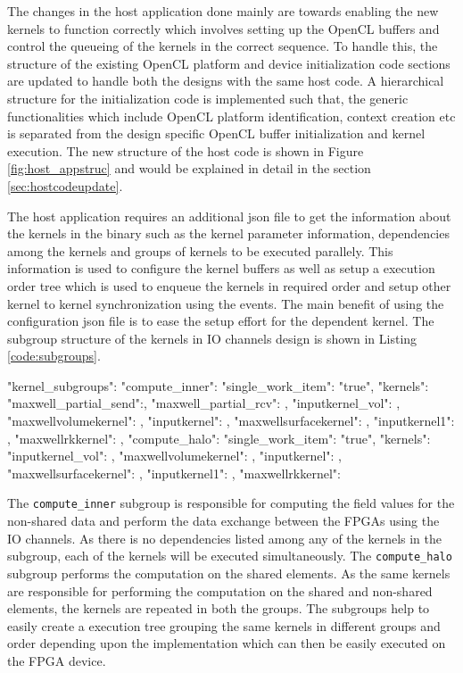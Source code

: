 The changes in the host application done mainly are towards enabling the new kernels to function correctly
which involves setting up the OpenCL buffers and control the queueing of the kernels in the correct sequence.
To handle this, the structure of the existing OpenCL platform and device initialization code sections are
updated to handle both the designs with the same host code. A hierarchical structure for the initialization code
is implemented such that, the generic functionalities which include OpenCL platform identification,
context creation etc is separated from the design specific OpenCL buffer
initialization and kernel execution. The new structure of the host code is shown
in Figure \ref{fig:host_appstruc} and would be explained in detail in the section \ref{sec:hostcodeupdate}.

The host application requires an additional json file to get the information about the kernels in the binary such as
the kernel parameter information, dependencies among the kernels and groups of kernels to be executed parallely.
This information is used to configure the kernel buffers as well as setup a execution order tree which is used
to enqueue the kernels in required order and setup other kernel to kernel synchronization using the events.
The main benefit of using the configuration json file is to ease the setup effort for the dependent kernel.
The subgroup structure of the kernels in IO channels design is shown in Listing \ref{code:subgroups}.

\begin{JsonCode}[caption=Kernel subgroups used in Multi FPGA design to enqueue kernels, frame=tlrb, label=code:subgroups]
"kernel_subgroups":
{
    "compute_inner":
    {
        "single_work_item": "true",
        "kernels":
        {
            "maxwell_partial_send":{},
            "maxwell_partial_rcv": {},
            "inputkernel_vol": {},
            "maxwellvolumekernel": {},
            "inputkernel": {},
            "maxwellsurfacekernel": {},
            "inputkernel1": {},
            "maxwellrkkernel": {}
        }
    },
    "compute_halo":
    {
        "single_work_item": "true",
        "kernels":
        {
            "inputkernel_vol": {},
            "maxwellvolumekernel": {},
            "inputkernel": {},
            "maxwellsurfacekernel": {},
            "inputkernel1": {},
            "maxwellrkkernel": {}
        }
    }
}
\end{JsonCode}

The \texttt{compute\_inner} subgroup is responsible for computing the field values for the non-shared
data and perform the data exchange between the FPGAs using the IO channels. As there is no dependencies
listed among any of the kernels in the subgroup, each of the kernels will be executed simultaneously.
The \texttt{compute\_halo} subgroup performs the computation on the shared elements. As the same kernels
are responsible for performing the computation on the shared and non-shared elements, the kernels are
repeated in both the groups. The subgroups help to easily create a execution tree grouping
the same kernels in different groups and order depending upon the implementation which can then be
easily executed on the FPGA device.

